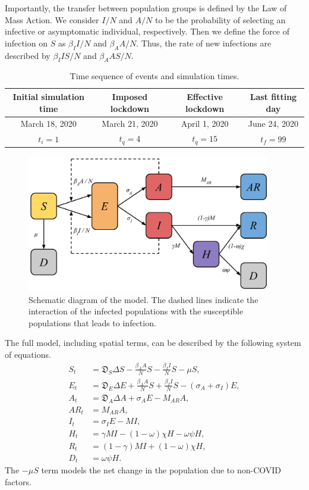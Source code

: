\documentclass[11pt]{article}
\newcommand{\D}{\mathfrak{D}}
\begin{document}
	Importantly, the transfer between population groups is defined by the Law of Mass Action.
	We consider $I/N$ and $A/N$ to be the probability of selecting an infective or asymptomatic individual, respectively.
	Then we define the force of infection on $S$ as $\beta_I I / N$ and $\beta_A A / N$.
	Thus, the rate of new infections are described by $\beta_I I S / N$ and $\beta_A A S / N$.
	
	\begin{table}[h]
		\centering
		\caption{Time sequence of events and simulation times.}
		\label{tab:times}
		\begin{tabular}{ c c c c }
			\hline
			\hline
			Initial simulation time	&	Imposed lockdown	&	Effective lockdown	&	Last fitting day	\\
			\hline
			March 18, 2020	&	March 21, 2020	&	 April 1, 2020	&	June 24, 2020	\\
			$t_i = 1$	&	$t_q = 4$	&	$t_q = 15$	&	$t_f = 99$ \\
			\hline
			\hline
		\end{tabular}
	\end{table}
	
	\begin{figure}[h!]
		\centering
		\includegraphics[height=6cm]{full-model}
		\caption{Schematic diagram of the model. The dashed lines indicate the interaction of the infected populations with the susceptible populations that leads to infection.}
		\label{fig:model}
	\end{figure}

	The full model, including spatial terms, can be described by the following system of equations.
	\begin{align*}
		S_t &=	\D_S \Delta S - \frac{\beta_{A} A}{N} S - \frac{\beta_{I} I}{N} S - \mu S, \\
		E_t	&=	\D_E \Delta E + \frac{\beta_{A} A}{N} S + \frac{\beta_{I} I}{N} S - (\sigma_A + \sigma_I) E, \\
		A_t	&=	\D_A \Delta A + \sigma_A E - M_{AR} A, \\
		AR_t &= M_{AR} A, \\		
		I_t	&=	\sigma_I E - M I, \\
		H_t	&=	\gamma M I - (1 - \omega) \chi H - \omega \psi H, \\
		R_t	&=	(1 - \gamma) M I + (1 - \omega) \chi H, \\
		D_t	&=	\omega \psi H.
	\end{align*}
	The $- \mu S$ term models the net change in the population due to non-COVID factors.
	
\end{document}
